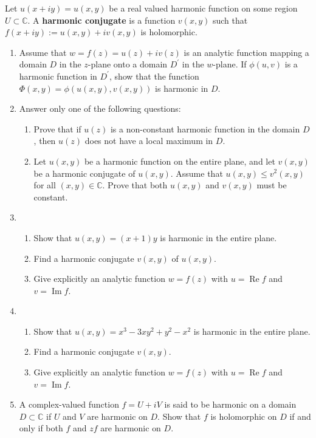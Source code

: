 \documentclass[a4paper,10pt]{article}
\newcommand{\CC}{\mathbb{C}}
\renewcommand{\Re}{\operatorname{Re}}
\renewcommand{\Im}{\operatorname{Im}}
\begin{document}
Let $u(x+iy)=u(x,y)$ be a real valued harmonic function on some region $U \subset \CC$.
A \textbf{harmonic conjugate} is a function $v(x,y)$ such that $f(x+iy):= u(x,y) + i v(x,y)$ is holomorphic.

\begin{enumerate}
			\item Assume that $w=f(z)=u(z)+iv(z)$ is an analytic function mapping a domain $D$ in the $z$-plane onto a domain $D^{\prime}$ in the $w$-plane.
	If $\phi(u,v)$ is a harmonic function in $D^{\prime}$, show that the function $\Phi(x,y)=\phi(u(x,y),v(x,y))$ is harmonic in $D$.
	
	\item Answer only one of the following questions:
	
	\begin{enumerate} 
		\item Prove that if $u(z)$ is a non-constant harmonic function in the domain $D$, then $u(z)$ does not have a local maximum in $D$.
		
		\item Let $u(x,y)$ be a harmonic function on the entire plane, and let $v(x,y)$ be a harmonic conjugate of $u(x,y)$.
		Assume that $u(x,y)\le v^{2}(x,y)$ for all $(x,y)\in \mathbb{C}$. Prove that both $u(x,y)$ and $v(x,y)$ must be constant.
	\end{enumerate}
	
	\item 
	\begin{enumerate}
		\item  Show that $u(x,y)=(x+1)y$ is harmonic in the entire plane.
		\item  Find a harmonic conjugate $v(x,y)$ of $u(x,y)$.
		\item Give explicitly an analytic function $w=f(z)$ with $u=\Re f$ and $v=\Im f$.
	\end{enumerate}
	
	
	\item 
	\begin{enumerate}
		\item Show that $u(x,y)=x^{3}-3xy^{2}+y^{2}-x^{2}$ is harmonic in the entire plane.
		\item Find a harmonic conjugate $v(x,y)$.
		\item Give explicitly an analytic function $w=f(z)$ with $u=\Re f$ and $v=\Im f$.
	\end{enumerate}
	
	\item  A complex-valued function $f=U+iV$ is said to be harmonic on a domain $D\subset\mathbb{C}$ if $U$ and $V$ are harmonic on $D$. Show that $f$ is holomorphic on $D$ if and only if both $f$ and $zf$ are harmonic on $D$.
	

\end{enumerate}
\end{document}
